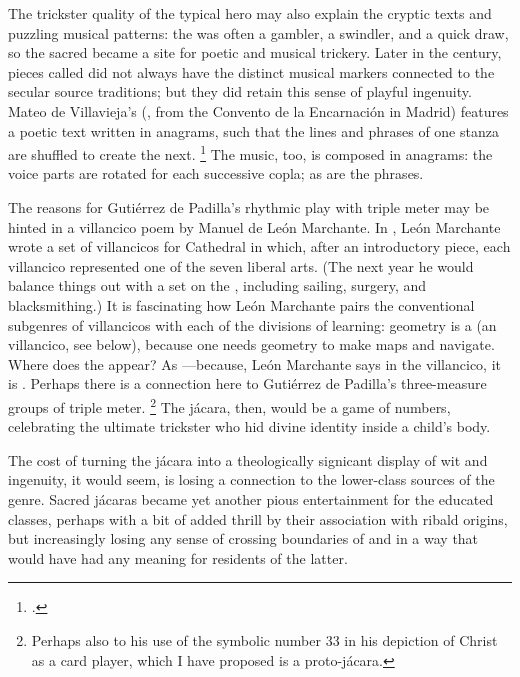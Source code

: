 The trickster quality of the typical  hero may also explain the
cryptic texts and puzzling musical patterns: the  was often a
gambler, a swindler, and a quick draw, so the sacred  became a
site for poetic and musical trickery.
Later in the century, pieces called  did not always have the
distinct musical markers connected to the secular source traditions; but they
did retain this sense of playful ingenuity.
Mateo de Villavieja's  (, from the
Convento de la Encarnación in Madrid)
features a poetic text written in anagrams, such that the lines and phrases of
one stanza are shuffled to create the next.%
    \footnote{.}
\XXX[details]
The music, too, is composed in anagrams: the voice parts are rotated for each
successive copla; as are the phrases. \XXX[details]

The reasons for Gutiérrez de Padilla's rhythmic play with triple meter may be
hinted in a  villancico poem by Manuel de León Marchante.
In \XXX[16XX], León Marchante wrote a set of villancicos for \XXX[Toledo]
Cathedral in which, after an introductory piece, each villancico represented
one of the seven liberal arts.
(The next year he would balance things out with a set on the , including sailing, surgery, and blacksmithing.\XXX[check!])
It is fascinating how León Marchante pairs the conventional subgenres of
villancicos with each of the divisions of learning: geometry is a
 (an  villancico, see below),
because one needs geometry to make maps and navigate.
Where does the  appear?
As ---because, León Marchante says in the villancico, it is
.
Perhaps there is a connection here to Gutiérrez de Padilla's three-measure
groups of triple meter.%
    \footnote{Perhaps also to his use of the symbolic number 33 in his
    depiction of Christ as a card player, which I have proposed is a
    proto-jácara.}
The jácara, then, would be a game of numbers, celebrating the ultimate
trickster who hid divine identity inside a child's body\XXX[etc].

The cost of turning the jácara into a theologically signicant display of
wit and ingenuity, it would seem, is losing a connection to the lower-class
sources of the genre.
Sacred jácaras became yet another pious entertainment for the educated classes,
perhaps with a bit of added thrill by their association with ribald origins,
but increasingly losing any sense of crossing boundaries of  and
 in a way that would have had any meaning for residents of the
latter.

